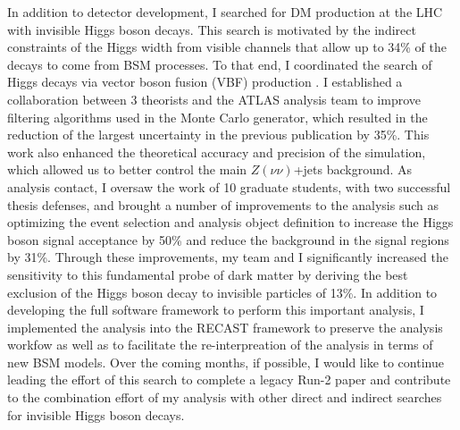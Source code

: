 \documentclass[a4paper]{article}
\begin{document}
In addition to detector development, I searched for DM production at the LHC with invisible Higgs boson decays. This search is motivated by the indirect constraints of the Higgs width from visible channels that allow up to 34\% of the decays to come from BSM processes. To that end, I coordinated the search of Higgs decays via vector boson fusion (VBF) production \cite{vbfMET_CONF2020}. I established a collaboration between 3 theorists and the ATLAS analysis team to improve filtering algorithms used in the Monte Carlo generator, which resulted in the reduction of the largest uncertainty in the previous publication by 35\%. This work also enhanced the theoretical accuracy and precision of the simulation, which allowed us to better control the main $Z\left(\nu\nu\right)$+jets background. As analysis contact, I oversaw the work of 10 graduate students, with two successful thesis defenses, and brought a number of improvements to the analysis such as optimizing the event selection and analysis object definition to increase the Higgs boson signal acceptance by 50\% and reduce the background in the signal regions by 31\%. Through these improvements, my team and I significantly increased the sensitivity to this fundamental probe of dark matter by deriving the best exclusion of the Higgs boson decay to invisible particles of 13\%. In addition to developing the full software framework to perform this important analysis, I implemented the analysis
into the RECAST framework to preserve the analysis workfow as well as to facilitate the re-interpreation of the analysis in terms of new BSM models.
Over the coming months, if possible, I would like to continue leading the effort of this search to complete a legacy Run-2 paper and contribute to the combination effort of my analysis with other direct and indirect searches for invisible Higgs boson decays.

\bigskip
\end{document}
